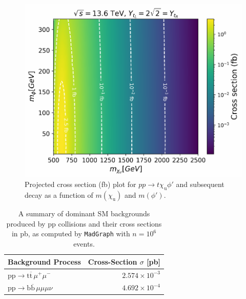 \begin{figure}
    \centering
    \includegraphics[width=0.85\linewidth]{Images/cross_section_by_masses.pdf}
    \caption{Projected cross section (fb) plot for $pp\to t \chi_\mathrm{u} \phi'$ and subsequent decay as a function of $m(\chi_\mathrm{u})$ and $m(\phi')$.}
    \label{fig:xs-plot}
\end{figure}

\begin{table}[]
  \begin{tabular}{l r}
    \hline
    {Background Process} & {Cross-Section $\sigma$ [\textrm{pb}]} \\
    \hline
   $\mathrm{pp} \to \mathrm{t} \overline{\mathrm{t}} \, \mu^+ \mu^-$ & $2.574\times 10^{-3}$  \\
    $\mathrm{pp} \to \mathrm{b}\overline{\mathrm{b}}\, \mu\mu\mu\nu $ & $4.692 \times 10^{-4}$ \\
    \hline
  \end{tabular}
  \centering
  \caption{A summary of dominant SM backgrounds produced by $\mathrm{pp}$ collisions and their cross sections in pb, as computed by \texttt{MadGraph} with $n = 10^6$ events.}
  \label{tab:dominantbkgs}
\end{table}


